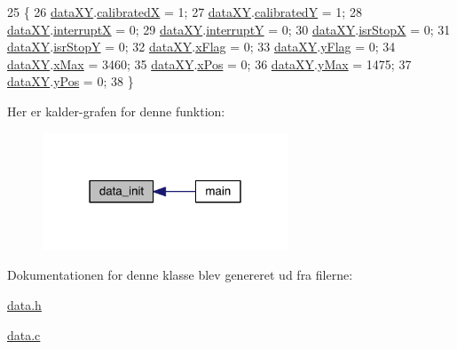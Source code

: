 \begin{DoxyCode}
25 \{
26   \hyperlink{data_8h_a89d7998a721b3f36f9f4131e7a5e42d2}{dataXY}.\hyperlink{data_8h_a20403c23f502143a2dd7ee5bb641c0ab}{calibratedX} = 1;
27   \hyperlink{data_8h_a89d7998a721b3f36f9f4131e7a5e42d2}{dataXY}.\hyperlink{data_8h_adebeaa27d72b604babe006a478cfed16}{calibratedY} = 1;
28   \hyperlink{data_8h_a89d7998a721b3f36f9f4131e7a5e42d2}{dataXY}.\hyperlink{data_8h_a4cacb2964bb4b589bf79aa64a398725b}{interruptX} = 0;
29   \hyperlink{data_8h_a89d7998a721b3f36f9f4131e7a5e42d2}{dataXY}.\hyperlink{data_8h_a0149ea97a32442280eb1c0b30c1eeaf1}{interruptY} = 0;
30   \hyperlink{data_8h_a89d7998a721b3f36f9f4131e7a5e42d2}{dataXY}.\hyperlink{data_8h_ab8211b7be27d53644048a83fccb95d70}{isrStopX} = 0;
31   \hyperlink{data_8h_a89d7998a721b3f36f9f4131e7a5e42d2}{dataXY}.\hyperlink{data_8h_a92ec85e6a09f5dc7ed83640f1810c4bb}{isrStopY} = 0;
32   \hyperlink{data_8h_a89d7998a721b3f36f9f4131e7a5e42d2}{dataXY}.\hyperlink{data_8h_abd60bb18cb69d4a782e0334caad9ffbc}{xFlag} = 0;
33   \hyperlink{data_8h_a89d7998a721b3f36f9f4131e7a5e42d2}{dataXY}.\hyperlink{data_8h_a2093b99c34cd9ec2a282b9c4c3f61935}{yFlag} = 0;
34   \hyperlink{data_8h_a89d7998a721b3f36f9f4131e7a5e42d2}{dataXY}.\hyperlink{data_8h_a5b6ae90a32a5f290afcc50656befceca}{xMax} = 3460;
35   \hyperlink{data_8h_a89d7998a721b3f36f9f4131e7a5e42d2}{dataXY}.\hyperlink{data_8h_a5262e09f478a571552e65be75c506bdb}{xPos} = 0;
36   \hyperlink{data_8h_a89d7998a721b3f36f9f4131e7a5e42d2}{dataXY}.\hyperlink{data_8h_ab979b62fb4882313ad47718325e34879}{yMax} = 1475;
37   \hyperlink{data_8h_a89d7998a721b3f36f9f4131e7a5e42d2}{dataXY}.\hyperlink{data_8h_a4c7347df04ab0f3d860046571be08af4}{yPos} = 0;
38 \}
\end{DoxyCode}


Her er kalder-\/grafen for denne funktion\+:
\nopagebreak
\begin{figure}[H]
\begin{center}
\leavevmode
\includegraphics[width=207pt]{dc/d07/class_data_adf37c815716edf228a3cbb4564290275_icgraph}
\end{center}
\end{figure}




Dokumentationen for denne klasse blev genereret ud fra filerne\+:\begin{DoxyCompactItemize}
\item 
\hyperlink{data_8h}{data.\+h}\item 
\hyperlink{data_8c}{data.\+c}\end{DoxyCompactItemize}
